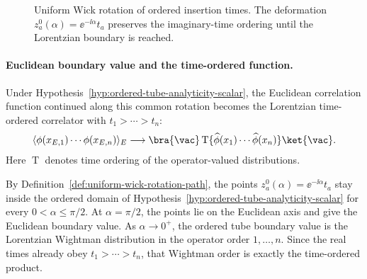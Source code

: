 \begin{figure}[H]
\centering
{}
\caption{Uniform Wick rotation of ordered insertion times.  The deformation
\(z_a^0(\alpha)=\ee^{-\ii\alpha}t_a\) preserves the imaginary-time ordering
until the Lorentzian boundary is reached.}
\label{fig:uniform-wick-rotation-insertion-times}
\end{figure}

\paragraph{Euclidean boundary value and the time-ordered function.}
Under Hypothesis~\ref{hyp:ordered-tube-analyticity-scalar}, the Euclidean
correlation function continued along this common rotation becomes the
Lorentzian time-ordered correlator with \(t_1>\cdots>t_n\):
\[
  \langle\phi(x_{E,1})\cdots\phi(x_{E,n})\rangle_E
  \longrightarrow
  \bra{\vac}
  \operatorname{T}\{\widehat\phi(x_1)\cdots\widehat\phi(x_n)\}
  \ket{\vac}.
\]
Here \(\operatorname{T}\) denotes time ordering of the operator-valued
distributions.

By Definition~\ref{def:uniform-wick-rotation-path}, the points
\(z_a^0(\alpha)=\ee^{-\ii\alpha}t_a\) stay inside the ordered domain of
Hypothesis~\ref{hyp:ordered-tube-analyticity-scalar} for every
\(0<\alpha\le\pi/2\).  At \(\alpha=\pi/2\), the points lie on the Euclidean
axis and give the Euclidean boundary value.  As \(\alpha\to0^+\), the ordered
tube boundary value is the Lorentzian Wightman distribution in the operator
order \(1,\ldots,n\).  Since the real times already obey
\(t_1>\cdots>t_n\), that Wightman order is exactly the time-ordered product.

